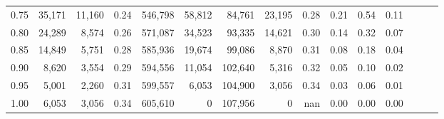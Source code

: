 \begin{tabular}{rrrrrrrrrrrrrrr}
0.75 &  35,171 &  11,160 &  0.24 &  546,798 &   58,812 &   84,761 &   23,195 &  0.28 &  0.21 &  0.54 &      0.11 \\
0.80 &  24,289 &   8,574 &  0.26 &  571,087 &   34,523 &   93,335 &   14,621 &  0.30 &  0.14 &  0.32 &      0.07 \\
0.85 &  14,849 &   5,751 &  0.28 &  585,936 &   19,674 &   99,086 &    8,870 &  0.31 &  0.08 &  0.18 &      0.04 \\
0.90 &   8,620 &   3,554 &  0.29 &  594,556 &   11,054 &  102,640 &    5,316 &  0.32 &  0.05 &  0.10 &      0.02 \\
0.95 &   5,001 &   2,260 &  0.31 &  599,557 &    6,053 &  104,900 &    3,056 &  0.34 &  0.03 &  0.06 &      0.01 \\
1.00 &   6,053 &   3,056 &  0.34 &  605,610 &        0 &  107,956 &        0 &   nan &  0.00 &  0.00 &      0.00 \\
\bottomrule
\end{tabular}
